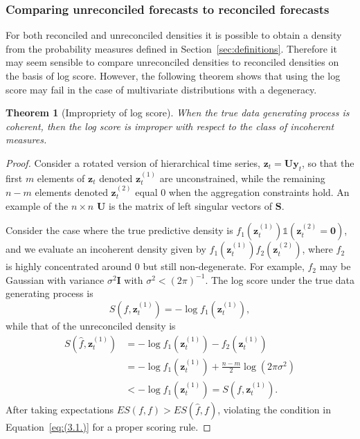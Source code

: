 \documentclass[a4paper, 11pt]{article}
\newtheorem{theo}{Theorem}[section]
\theoremstyle{definition}
\begin{document}
\subsubsection{Comparing unreconciled forecasts to reconciled forecasts}

For both reconciled and unreconciled densities it is possible to obtain a density from the probability measures defined in Section~\ref{sec:definitions}. Therefore it may seem sensible to compare unreconciled densities to reconciled densities on the basis of log score. However, the following theorem shows that using the log score may fail in the case of multivariate distributions with a degeneracy.

\begin{theo}[Impropriety of log score]
	When the true data generating process is coherent, then the log score is improper with respect to the class of incoherent measures.
\end{theo}

\begin{proof}
Consider a rotated version of hierarchical time series, $\bm{z}_t=\bm{U}\bm{y}_t$, so that the first $m$ elements of $\bm{z}_t$ denoted $\bm{z}^{(1)}_t$ are unconstrained, while the remaining $n-m$ elements denoted $\bm{z}^{(2)}_t$ equal $0$ when the aggregation constraints hold. An example of the $n\times n$ $\bm{U}$ is the matrix of left singular vectors of $\bm{S}$. %

Consider the case where the true predictive density is $f_1(\bm{z}^{(1)}_t)\mathbb{1}\left(\bm{z}^{(2)}_t=\bm{0}\right)$, and we evaluate an incoherent density given by $f_1(\bm{z}^{(1)}_t)f_2(\bm{z}^{(2)}_t)$, where $f_2$ is highly concentrated around $0$ but still non-degenerate. For example, $f_2$ may be Gaussian with variance $\sigma^2{\bm{I}}$ with $\sigma^2 < (2\pi)^{-1}$. The log score under the true data generating process is
\[
S\left(f,\bm{z}^{(1)}_t\right) = -\log f_1\left(\bm{z}^{(1)}_t\right),
\]
while that of the unreconciled density is
\begin{align}
S\left(\hat{f},\bm{z}^{(1)}_t\right) &= -\log f_1(\bm{z}^{(1)}_t)-f_2(\bm{z}^{(1)}_t)\\
&= -\log f_1(\bm{z}^{(1)}_t)+\frac{n-m}{2}\log(2\pi\sigma^2)\\
&<-\log f_1(\bm{z}^{(1)}_t)=S\left(f,\bm{z}^{(1)}_t\right).
\end{align}
After taking expectations $ES(f,f) > ES(\hat{f},f)$, violating the condition in Equation~\eqref{eq:(3.1.)} for a proper scoring rule.
\end{proof}
\end{document}
